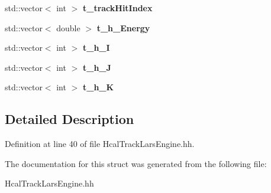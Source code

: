 \begin{DoxyCompactItemize}
\item 
std::vector$<$ int $>$ {\bfseries t\_\-trackHitIndex}\label{structmarlin_1_1HcalTrackLarsEngine_1_1EventTracks_a365a327f54fdd172ab587471e2ec80c9}

\item 
std::vector$<$ double $>$ {\bfseries t\_\-h\_\-Energy}\label{structmarlin_1_1HcalTrackLarsEngine_1_1EventTracks_a0b68bc1477a79ffa9ba510de1baab00d}

\item 
std::vector$<$ int $>$ {\bfseries t\_\-h\_\-I}\label{structmarlin_1_1HcalTrackLarsEngine_1_1EventTracks_af8b2b5c111fd7364d8bfa55e6378c717}

\item 
std::vector$<$ int $>$ {\bfseries t\_\-h\_\-J}\label{structmarlin_1_1HcalTrackLarsEngine_1_1EventTracks_a45e59e176ffe04314bb717244e3fe378}

\item 
std::vector$<$ int $>$ {\bfseries t\_\-h\_\-K}\label{structmarlin_1_1HcalTrackLarsEngine_1_1EventTracks_aea3f09c827cc8f2e5159d9002e88084e}

\end{DoxyCompactItemize}


\subsection{Detailed Description}


Definition at line 40 of file HcalTrackLarsEngine.hh.

The documentation for this struct was generated from the following file:\begin{DoxyCompactItemize}
\item 
HcalTrackLarsEngine.hh\end{DoxyCompactItemize}
